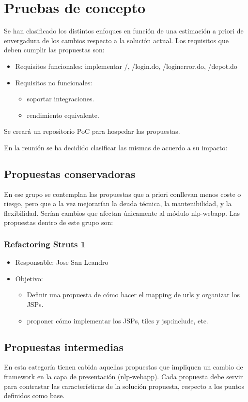 \documentclass[11pt]{article}
\begin{document}
\section{Pruebas de concepto}
\label{sec-3}
Se han clasificado los distintos enfoques en función de una estimación a priori de envergadura de los cambios respecto a la solución actual.
Los requisitos que deben cumplir las propuestas son:
\begin{itemize}
\item Requisitos funcionales: implementar /, /login.do, /loginerror.do, /depot.do
\item Requisitos no funcionales:
\begin{itemize}
\item soportar integraciones.
\item rendimiento equivalente.
\end{itemize}
\end{itemize}

Se creará un repositorio PoC para hospedar las propuestas.

En la reunión se ha decidido clasificar las mismas de acuerdo a su impacto:
\subsection{Propuestas conservadoras}
\label{sec-3-1}
En ese grupo se contemplan las propuestas que a priori conllevan menos coste o riesgo, pero que a la vez mejorarían la deuda técnica, la mantenibilidad, y la flexibilidad.
Serían cambios que afectan únicamente al módulo nlp-webapp.
Las propuestas dentro de este grupo son:
\subsubsection{Refactoring Struts 1}
\label{sec-3-1-1}
\begin{itemize}
\item Responsable: Jose San Leandro
\item Objetivo:
\begin{itemize}
\item Definir una propuesta de cómo hacer el mapping de urls y organizar los JSPs.
\item proponer cómo implementar los JSPs, tiles y jsp:include, etc.
\end{itemize}
\end{itemize}
\subsection{Propuestas intermedias}
\label{sec-3-2}
En esta categoría tienen cabida aquellas propuestas que impliquen un cambio de framework en la capa de presentación (nlp-webapp).
Cada propuesta debe servir para contrastar las características de la solución propuesta, respecto a los puntos definidos como base.
\end{document}
